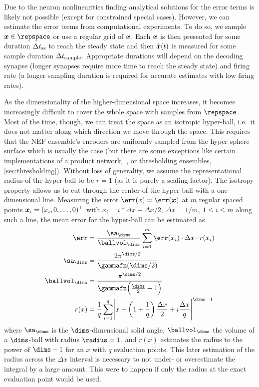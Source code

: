 Due to the neuron nonlinearities finding analytical solutions for the error terms is likely not possible (except for constrained special cases).
However, we can estimate the error terms from computational experiments.
To do so, we sample $\vc x \in \repspace$ or use a regular grid of $\bm{x}$.
Each $\bm{x}$ is then presented for some duration $\Delta t_{{\mathrm{ss}}}$ to reach the steady state and then $\hat{\bm{x}}(t)$ is measured for some sample duration $\Delta t_{{\mathrm{sample}}}$.
Appropriate durations will depend on the decoding synapse (longer synapses require more time to reach the steady state) and firing rate (a longer sampling duration is required for accurate estimates with low firing rates).

As the dimensionality of the higher-dimensional space increases, it becomes increasingly difficult to cover the whole space with samples from $\repspace$.
Most of the time, though, we can treat the space as an isotropic hyper-ball, i.e.\ it does not matter along which direction we move through the space.
This requires that the NEF ensemble's encoders are uniformly sampled from the hyper-sphere surface which is usually the case (but there are some exceptions like certain implementations of a product network,~\cite{gosmann2015-1}, or thresholding ensembles, \cref{sec:thresholding}).
Without loss of generality, we assume the representational radius of the hyper-ball to be $r = 1$ (as it is purely a scaling factor).
The isotropy property allows us to cut through the center of the hyper-ball with a one-dimensional line.
Measuring the error $\err(x) = \err(\vc x)$ at $m$ regular spaced points $\bm{x}_i = (x_i, 0, \dotsc, 0)^{\top}$ with $x_i = i * \Delta x - \Delta x/2,\ \Delta x = 1/m,\ 1 \leq i \leq m$ along such a line, the mean error for the hyper-ball can be estimated as
\begin{align}
    \err &= \frac{\sa_{\dims}}{\ballvol_{\dims}} \sum_{i=1}^{m} \err(x_i) \cdot \Delta x \cdot r(x_i) \\
    \sa_{\dims} &= \frac{2 \pi^{\dims/2}}{\gammafn(\dims/2)} \\
    \ballvol_{\dims} &= \frac{\pi^{\dims/2}}{\gammafn\!\del{\frac{\dims}{2} + 1}} \\
    r(x) &= \frac{1}{q} \sum_{i=1}^{q} \abs{x - \del{1 + \frac{1}{q}} \frac{\Delta x}{2} + i \frac{\Delta x}{q}}^{\dims - 1}
\end{align}
where $\sa_{\dims}$ is the $\dims$-dimensional solid angle, $\ballvol_{\dims}$ the volume of a $\dims$-ball with radius $\radius = 1$, and $r(x)$ estimates the radius to the power of $\dims-1$ for an $x$ with $q$ evaluation points.
This later estimation of the radius across the $\Delta x$ interval is necessary to not under- or overestimate the integral by a large amount.
This were to happen if only the radius at the exact evaluation point would be used.



